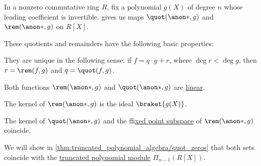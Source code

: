 \begin{proposition}\label{thm:alg:euclidean_division_of_polynomials}
  In a nonzero commutative ring \( R \), fix a polynomial \( g(X) \) of degree \( n \) whose leading coefficient is invertible.  gives us maps \( \quot(\anon*, g) \) and \( \rem(\anon*, g) \) on \( R[X] \).

  These quotients and remainders have the following basic properties:
  \begin{thmenum}
     They are unique in the following sense: if \( f = q \cdot g + r \), where \( \deg r < \deg g \), then \( r = \rem(f, g) \) and \( q = \quot(f, g) \).

     Both functions \( \rem(\anon*, g) \) and \( \quot(\anon*, g) \) are \hyperref[def:linear_function]{linear}.

     The kernel of \( \rem(\anon*, g) \) is the ideal \( \braket{ g(X) } \).

     The kernel of \( \quot(\anon*, g) \) and the f\hyperref[def:fol_fixed_point_substructure]{fixed point subspace} of \( \rem(\anon*, g) \) coincide.

    We will show in \cref{thm:truncated_polynomial_algebra/quot_zeros} that both sets coincide with the \hyperref[def:truncated_polynomial_algebra]{truncated polynomial module} \( \Pi_{n-1}(R[X]) \).
  \end{thmenum}
\end{proposition}
